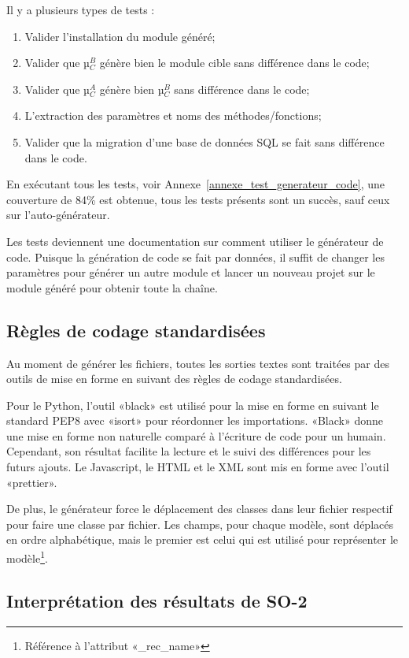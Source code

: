 Il y a plusieurs types de tests : 
\begin{enumerate}
    \item Valider l’installation du module généré;
    \item Valider que µ$_C^B$ génère bien le module cible sans différence dans le code;
    \item Valider que µ$_C^A$ génère bien µ$_C^B$ sans différence dans le code;
    \item L’extraction des paramètres et noms des méthodes/fonctions;
    \item Valider que la migration d’une base de données SQL se fait sans différence dans le code.
\end{enumerate}

En exécutant tous les tests, voir Annexe~\ref{annexe_test_generateur_code}, une couverture de 84\% est obtenue, tous les tests présents sont un succès, sauf ceux sur l’auto-générateur.

Les tests deviennent une documentation sur comment utiliser le générateur de code. Puisque la génération de code se fait par données, il suffit de changer les paramètres pour générer un autre module et lancer un nouveau projet sur le module généré pour obtenir toute la chaîne.

\subsection {Règles de codage standardisées}

Au moment de générer les fichiers, toutes les sorties textes sont traitées par des outils de mise en forme en suivant des règles de codage standardisées.

Pour le Python, l’outil «black» est utilisé pour la mise en forme en suivant le standard PEP8 avec «isort» pour réordonner les importations. «Black» donne une mise en forme non naturelle comparé à l’écriture de code pour un humain. Cependant, son résultat facilite la lecture et le suivi des différences pour les futurs ajouts. Le Javascript, le HTML et le XML sont mis en forme avec l’outil «prettier».

De plus, le générateur force le déplacement des classes dans leur fichier respectif pour faire une classe par fichier. Les champs, pour chaque modèle, sont déplacés en ordre alphabétique, mais le premier est celui qui est utilisé pour représenter le modèle\footnote{Référence à l'attribut «\_rec\_name»}.

\subsection{Interprétation des résultats de SO-2}


